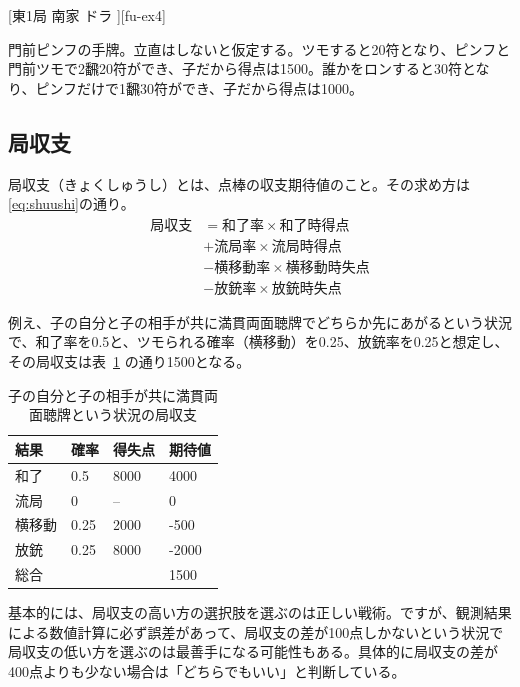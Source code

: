 \documentclass[10pt, twocolumn, notitlepage]{report}
\begin{document}
[東1局 南家 ドラ ][fu-ex4]

門前ピンフの手牌。立直はしないと仮定する。ツモすると20符となり、ピンフと門前ツモで2飜20符ができ、子だから得点は1500。誰かをロンすると30符となり、ピンフだけで1飜30符ができ、子だから得点は1000。

\subsection{局収支}

局収支（きょくしゅうし）とは、点棒の収支期待値のこと\citep[][p. 17]{miinin-stat}。その求め方は\eqref{eq:shuushi}の通り\citep[][p. 18]{miinin-stat}。
%
\begin{align}
  \text{局収支} &= \text{和了率} \times \text{和了時得点} \nonumber \\
  &+ \text{流局率} \times \text{流局時得点} \nonumber \\
  &- \text{横移動率} \times \text{横移動時失点} \nonumber \\
  &- \text{放銃率} \times \text{放銃時失点} \label{eq:shuushi}
\end{align}

例え、子の自分と子の相手が共に満貫両面聴牌でどちらか先にあがるという状況で、和了率を0.5と、ツモられる確率（横移動）を0.25、放銃率を0.25と想定し、その局収支は表~\ref{tab:kss1} の通り1500となる。

\begin{table}
  \centering
  \begin{tabular}{llll}
    結果 & 確率 & 得失点 & 期待値 \\
    \hline
    和了  & 0.5 & 8000  & 4000 \\
    流局  & 0 & --      & 0 \\
    横移動 & 0.25 & 2000 & -500 \\
    放銃  & 0.25 & 8000 & -2000 \\
    総合 & & & 1500
  \end{tabular}
  \caption{子の自分と子の相手が共に満貫両面聴牌という状況の局収支}
  \label{tab:kss1}
\end{table}

基本的には、局収支の高い方の選択肢を選ぶのは正しい戦術。ですが、観測結果による数値計算に必ず誤差があって、局収支の差が100点しかないという状況で局収支の低い方を選ぶのは最善手になる可能性もある\citep[][p. 21]{miinin-stat}。具体的に局収支の差が400点よりも少ない場合は「どちらでもいい」と判断している\citep[][p.25]{miinin-stat}。
\end{document}
